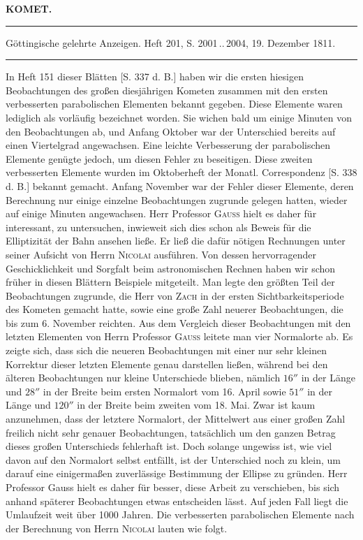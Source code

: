 \clearpage{}\hypertarget{native-347-lower}{}\label{native-347-lower}
\begin{center}\textbf{KOMET.}\par\vspace{4pt}\hrule\vspace{4pt}\fontsize{10}{12}\selectfont Göttingische gelehrte Anzeigen. Heft 201, S. 2001\,..\,2004, 19. Dezember 1811.\par\vspace{4pt}\hrule\vspace{4pt}\end{center}

\par\indent In Heft 151 dieser Blätten [S. 337 d. B.] haben wir die ersten hiesigen Beobachtungen des großen diesjährigen Kometen zusammen mit den ersten verbesserten parabolischen Elementen bekannt gegeben. Diese Elemente waren lediglich als vorläufig bezeichnet worden. Sie wichen bald um einige Minuten von den Beobachtungen ab, und Anfang Oktober war der Unterschied bereits auf einen Viertelgrad angewachsen. Eine leichte Verbesserung der parabolischen Elemente genügte jedoch, um diesen Fehler zu beseitigen. Diese zweiten verbesserten Elemente wurden im Oktoberheft der Monatl. Correspondenz [S. 338 d. B.] bekannt gemacht. Anfang November war der Fehler dieser Elemente, deren Berechnung nur einige einzelne Beobachtungen zugrunde gelegen hatten, wieder auf einige Minuten angewachsen. Herr Professor \textsc{Gauß} hielt es daher für interessant, zu untersuchen, inwieweit sich dies schon als Beweis für die Elliptizität der Bahn ansehen ließe. Er ließ die dafür nötigen Rechnungen unter seiner Aufsicht von Herrn \textsc{Nicolai} ausführen. Von dessen hervorragender Geschicklichkeit und Sorgfalt beim astronomischen Rechnen haben wir schon früher in diesen Blättern Beispiele mitgeteilt. Man legte den größten Teil der Beobachtungen zugrunde, die Herr von \textsc{Zach} in der ersten Sichtbarkeitsperiode des Kometen gemacht hatte, sowie eine große Zahl neuerer Beobachtungen, die bis zum 6. November reichten. Aus dem Vergleich dieser Beobachtungen mit den letzten Elementen von Herrn Professor \textsc{Gauß} leitete man vier Normalorte ab. Es zeigte sich, dass sich die neueren Beobachtungen mit einer nur sehr kleinen Korrektur dieser letzten Elemente genau darstellen ließen, während bei den älteren Beobachtungen nur kleine Unterschiede blieben, nämlich $16''$ in der Länge und $28''$ in der Breite beim ersten Normalort vom 16. April sowie $51''$ in der Länge und $120''$ in der Breite beim zweiten vom 18. Mai. Zwar ist kaum anzunehmen, dass der letztere Normalort, der Mittelwert aus einer großen Zahl freilich nicht sehr genauer Beobachtungen, tatsächlich um den ganzen Betrag dieses großen Unterschieds fehlerhaft ist. Doch solange ungewiss ist, wie viel davon auf den Normalort selbst entfällt, ist der Unterschied noch zu klein, um darauf eine einigermaßen zuverlässige Bestimmung der Ellipse zu gründen. Herr Professor Gauss hielt es daher für besser, diese Arbeit zu verschieben, bis sich anhand späterer Beobachtungen etwas entscheiden lässt. Auf jeden Fall liegt die Umlaufzeit weit über 1000 Jahren. Die verbesserten parabolischen Elemente nach der Berechnung von Herrn \textsc{Nicolai} lauten wie folgt.

